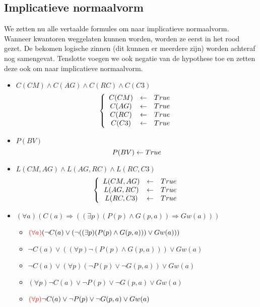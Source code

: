 \documentclass[alternative-exam.tex]{subfiles}
\begin{document}
\subsection{Implicatieve normaalvorm}
We zetten nu alle vertaalde formules om naar implicatieve normaalvorm.
Wanneer kwantoren weggelaten kunnen worden, worden ze eerst in het rood gezet. De bekomen logische zinnen (dit kunnen er meerdere zijn) worden achteraf nog samengevat. Tenslotte voegen we ook negatie van de hypothese toe en zetten deze ook om naar implicatieve normaalvorm.
\begin{itemize}
\item $C(CM)\wedge C(AG)\wedge C(RC)\wedge C(C3)$
\[
\left\{
\begin{array}{c c c}
C(CM) &\leftarrow& True\\
C(AG) &\leftarrow& True\\
C(RC) &\leftarrow& True\\
C(C3) &\leftarrow& True\\
\end{array}
\right.
\]

\item $P(BV)$
\[
P(BV) \leftarrow True\\
\]

\item $L(CM,AG) \wedge L(AG,RC) \wedge L(RC,C3)$
\[
\left\{
\begin{array}{c c c}
L(CM,AG) &\leftarrow& True\\
L(AG,RC) &\leftarrow& True\\
L(RC,C3) &\leftarrow& True\\
\end{array}
\right.
\]

\item $(\forall a)(C(a) \Rightarrow ((\exists p) (P(p) \wedge G(p,a)) \Rightarrow Gw(a)))$
\begin{itemize}
\item $ {\color{red}(\forall a)} (\neg C(a) \vee (\neg ((\exists p)(P(p)\wedge G(p,a))) \vee Gw(a)))$

\item $\neg C(a) \vee ((\forall p)\neg(P(p)\wedge G(p,a))) \vee Gw(a)$

\item $\neg C(a) \vee (\forall p)(\neg P(p)\vee \neg G(p,a)) \vee Gw(a)$

\item $(\forall p) \neg C(a) \vee \neg P(p) \vee \neg G(p,a) \vee Gw(a)$

\item ${\color{red}(\forall p)} \neg C(a) \vee \neg P(p) \vee \neg G(p,a) \vee Gw(a)$


\end{itemize}
\end{itemize}
\end{document}

